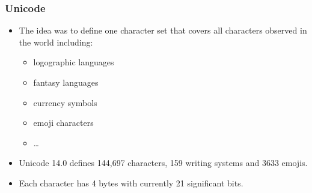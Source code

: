             \subsubsection{Unicode} %
                \begin{itemize}
                	\item The idea was to define one character set that covers all characters observed in the world including:
                		\begin{itemize}
                			\item logographic languages
                			\item fantasy languages
                			\item currency symbols
                			\item emoji characters
                			\item \dots
                		\end{itemize}
                	\item Unicode 14.0 defines 144,697 characters, 159 writing systems and 3633 emojis.
                	\item Each character has 4 bytes with currently 21 significant bits.
                \end{itemize}
            
